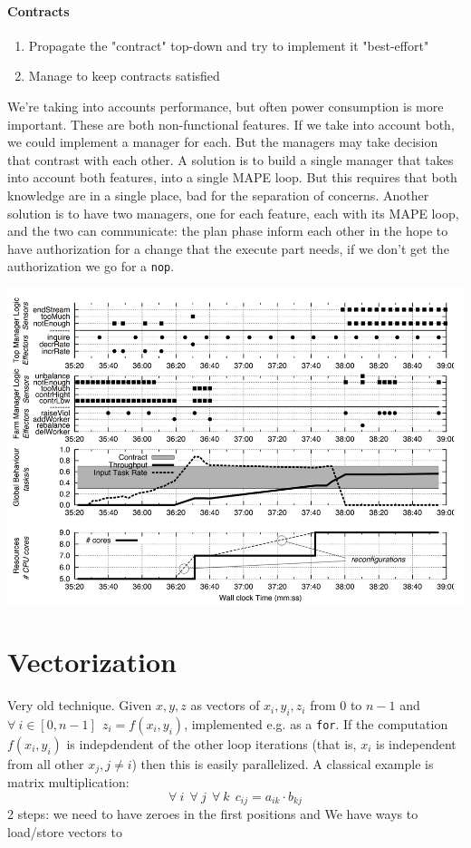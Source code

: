 \documentclass[10pt]{report}
\begin{document}
\paragraph{Contracts}\begin{enumerate} %
	\item Propagate the "contract" top-down and try to implement it "best-effort"
	\item Manage to keep contracts satisfied 
\end{enumerate}
We're taking into accounts performance, but often power consumption is more important. These are both non-functional features. If we take into account both, we could implement a manager for each. But the managers may take decision that contrast with each other. A solution is to build a single manager that takes into account both features, into a single MAPE loop. But this requires that both knowledge are in a single place, bad for the separation of concerns. Another solution is to have two managers, one for each feature, each with its MAPE loop, and the two can communicate: the plan phase inform each other in the hope to have authorization for a change that the execute part needs, if we don't get the authorization we go for a \texttt{nop}.
\begin{center}
	\includegraphics[scale=0.5]{15.png}
\end{center}
\section{Vectorization}
Very old technique. %
Given $x, y, z$ as vectors of $x_i, y_i, z_i$ from $0$ to $n-1$ and $\forall\:i\in[0,n-1]\:\:z_i=f(x_i,y_i)$, implemented e.g. as a \texttt{for}. If the computation $f(x_i, y_i)$ is indepdendent of the other loop iterations (that is, $x_i$ is independent from all other $x_j, j\neq i$) then this is easily parallelized. A classical example is matrix multiplication: $$\forall\:i\:\:\forall\:j\:\:\forall\:k\:\:c_{ij} = a_{ik}\cdot b_{kj}$$
2 steps: we need to have zeroes in the first positions and %
We have ways to load/store vectors to %
\end{document}
